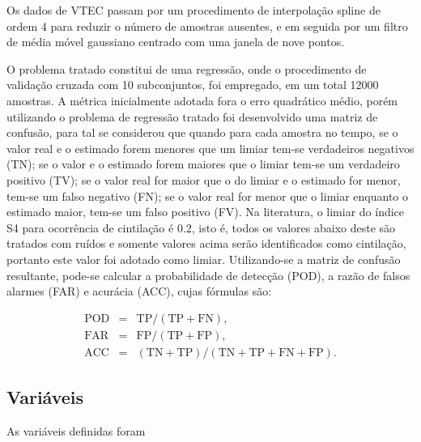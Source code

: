 Os dados de VTEC passam por um procedimento de interpolação  spline de ordem 4 para reduzir o número de amostras ausentes, e em seguida por um filtro de média móvel gaussiano centrado com uma janela de nove pontos.

O problema tratado constitui de uma regressão, onde o procedimento de validação cruzada com 10 subconjuntos, foi empregado, em um total 12000 amostras. A métrica inicialmente adotada fora o erro quadrático médio, porém utilizando o problema de regressão tratado foi desenvolvido uma matriz de confusão, para tal se considerou que quando para cada amostra no tempo, se o valor real e o estimado forem menores que um limiar tem-se verdadeiros negativos (TN); se o valor e o estimado forem maiores que o limiar tem-se um verdadeiro positivo (TV); se o valor real for maior que o do limiar e o estimado for menor, tem-se um falso negativo (FN); se o valor real for menor que o limiar enquanto o estimado maior, tem-se um falso positivo (FV). Na literatura, o limiar do índice S4 para ocorrência de cintilação é 0.2, isto é, todos os valores abaixo deste são tratados com ruídos e somente valores acima serão identificados como cintilação, portanto este valor foi adotado como limiar. Utilizando-se a matriz de confusão resultante, pode-se calcular a probabilidade de detecção (POD), a razão de falsos alarmes (FAR) e acurácia (ACC), cujas fórmulas são:

\begin{eqnarray}
\mbox{POD}&=&\mbox{TP}/(\mbox{TP}+\mbox{FN})\mbox{,}\\
\mbox{FAR}&=&\mbox{FP}/(\mbox{TP}+\mbox{FP})\mbox{,}\\
\mbox{ACC}&=&(\mbox{TN}+\mbox{TP})/(\mbox{TN}+\mbox{TP}+\mbox{FN}+\mbox{FP})\mbox{.}
\end{eqnarray}

\subsection{Variáveis}

As variáveis definidas foram

